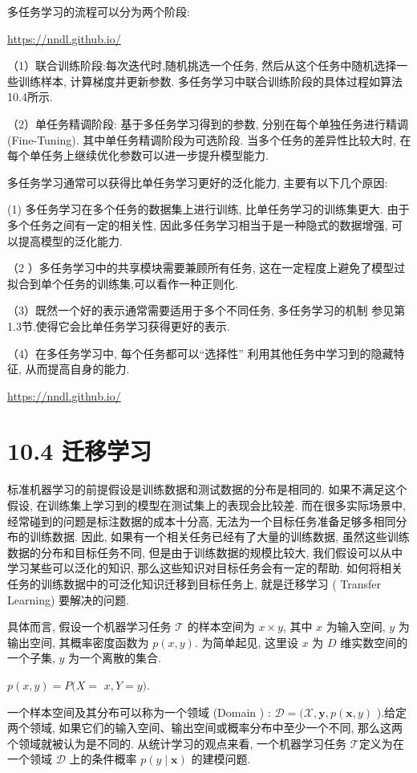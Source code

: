 \documentclass[10pt]{article}
\begin{document}
多任务学习的流程可以分为两个阶段:

\href{https://nndl.github.io/}{https://nndl.github.io/}

（1）联合训练阶段:每次迭代时,随机挑选一个任务, 然后从这个任务中随机选择一些训练样本, 计算梯度并更新参数. 多任务学习中联合训练阶段的具体过程如算法10.4所示.



（2）单任务精调阶段: 基于多任务学习得到的参数, 分别在每个单独任务进行精调 (Fine-Tuning). 其中单任务精调阶段为可选阶段. 当多个任务的差异性比较大时, 在每个单任务上继续优化参数可以进一步提升模型能力.

多任务学习通常可以获得比单任务学习更好的泛化能力, 主要有以下几个原因:

(1) 多任务学习在多个任务的数据集上进行训练, 比单任务学习的训练集更大. 由于多个任务之间有一定的相关性, 因此多任务学习相当于是一种隐式的数据增强, 可以提高模型的泛化能力.

（2 ）多任务学习中的共享模块需要兼顾所有任务, 这在一定程度上避免了模型过拟合到单个任务的训练集,可以看作一种正则化.

（3）既然一个好的表示通常需要适用于多个不同任务, 多任务学习的机制 参见第1.3节.使得它会比单任务学习获得更好的表示.

（4）在多任务学习中, 每个任务都可以“选择性” 利用其他任务中学习到的隐藏特征, 从而提高自身的能力.

\href{https://nndl.github.io/}{https://nndl.github.io/}

\section*{10.4 迁移学习}
标准机器学习的前提假设是训练数据和测试数据的分布是相同的. 如果不满足这个假设, 在训练集上学习到的模型在测试集上的表现会比较差. 而在很多实际场景中, 经常碰到的问题是标注数据的成本十分高, 无法为一个目标任务准备足够多相同分布的训练数据. 因此, 如果有一个相关任务已经有了大量的训练数据, 虽然这些训练数据的分布和目标任务不同, 但是由于训练数据的规模比较大, 我们假设可以从中学习某些可以泛化的知识, 那么这些知识对目标任务会有一定的帮助. 如何将相关任务的训练数据中的可泛化知识迁移到目标任务上, 就是迁移学习 ( Transfer Learning) 要解决的问题.

具体而言, 假设一个机器学习任务 $\mathcal{T}$ 的样本空间为 $x \times y$, 其中 $x$ 为输入空间, $y$ 为输出空间, 其概率密度函数为 $p(x, y)$. 为简单起见, 这里设 $x$ 为 $D$ 维实数空间的一个子集, $y$ 为一个离散的集合.

$p(x, y)=P(X=$ $x, Y=y)$.

一个样本空间及其分布可以称为一个领域 (Domain ) : $\mathcal{D}=(\mathcal{X}, \boldsymbol{y}, p(\boldsymbol{x}, y)$ ).给定两个领域, 如果它们的输入空间、输出空间或概率分布中至少一个不同, 那么这两个领域就被认为是不同的. 从统计学习的观点来看, 一个机器学习任务 $\mathcal{T}$定义为在一个领域 $\mathcal{D}$ 上的条件概率 $p(y \mid \boldsymbol{x})$ 的建模问题.
\end{document}
